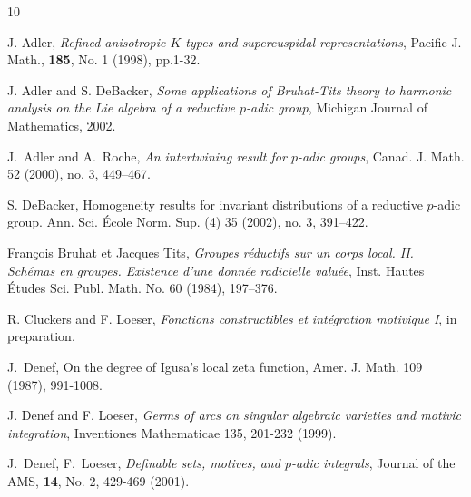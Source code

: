 \documentclass[11pt]{amsart}
\theoremstyle{definition}
\theoremstyle{remark}
\numberwithin{equation}{theorem}
\begin{document}

\begin{thebibliography}{10}



J. Adler, {\sl Refined anisotropic $K$-types and supercuspidal
representations}, Pacific J. Math., {\bf 185}, No. 1 (1998),
pp.1-32.

J. Adler and S. DeBacker, {\it Some applications of Bruhat-Tits
theory to harmonic analysis on the Lie algebra of a reductive
$p$-adic group}, Michigan Journal of Mathematics, 2002.


 J.~Adler and A.~Roche, {\it An intertwining result for
$p$-adic groups}, Canad. J. Math. 52 (2000), no. 3, 449--467.



 S. DeBacker,
Homogeneity results for invariant distributions of a reductive
$p$-adic group. Ann. Sci. \'Ecole Norm. Sup. (4) 35 (2002), no. 3,
391--422.

 Fran\c cois Bruhat et Jacques Tits,
{\em Groupes r\'eductifs sur un corps local. II. Sch\'emas en
groupes. Existence d'une donn\'ee radicielle valu\'ee}, Inst.
Hautes \'Etudes Sci. Publ. Math. No. 60 (1984), 197--376.

 R. Cluckers and F. Loeser, {\it Fonctions
constructibles et int\'egration motivique I}, in preparation.



 J.~Denef, On the degree of Igusa's local zeta
function, Amer. J. Math. 109 (1987), 991-1008.

 J. Denef and F. Loeser, {\it Germs of arcs on singular
algebraic varieties and motivic integration}, Inventiones
Mathematicae 135, 201-232 (1999).

 J.~Denef, F.~Loeser, {\it Definable sets, motives,
            and $p$-adic integrals}, Journal of the AMS, {\bf 14},
           No. 2, 429-469 (2001).


\end{thebibliography}
\end{document}
